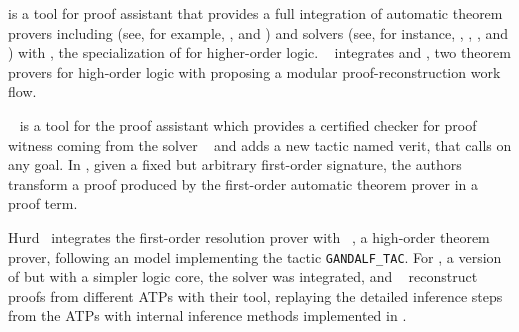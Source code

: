 \documentclass[../main.tex]{subfiles}
\begin{document}
 is a tool for  proof assistant
\cite{paulson1994isabelle} that provides a full integration of
automatic theorem provers including \ATPs (see, for example,
\cite{meng2006automation}, \cite{blanchette2013extending} and
\cite{Fleury2014}) and \SMT solvers (see, for instance,
\cite{hurlin07practical}, \cite{bohme2010},
\cite{blanchette2013extending}, and \cite{Fleury2014}) with
 \cite{nipkow2002isabelle}, the specialization of
 for higher-order logic.
\citeauthor{Een2004}~\cite{Een2004} integrates  and
, two theorem provers for high-order logic with
 proposing a modular proof-reconstruction work
flow.

~\cite{armand2011,Ekici2017} is a tool for the
 proof assistant \cite{coqteam} which provides a certified
checker for proof witness coming from the \SMT solver
~\cite{bouton2009} and adds a new tactic named verit,
that calls  on any  goal.
In \cite{Bezem2002},
given a fixed but arbitrary first-order signature, the authors
transform a proof produced by the first-order automatic theorem
prover  \cite{deNivelle2003} in a  proof
term.

Hurd~\cite{Hurd1999} integrates the first-order resolution prover
 with ~\cite{norrish2007hol}, a high-order
theorem prover, following an  model implementing the
tactic \verb!GANDALF_TAC!. For , a version of
 but with a simpler logic core, the \SMT solver 
was integrated, and \citeauthor{kaliszyk2013}~\cite{kaliszyk2013}
reconstruct proofs from different ATPs with their  tool,
replaying the detailed inference steps from the ATPs with internal
inference methods implemented in .





\end{document}

